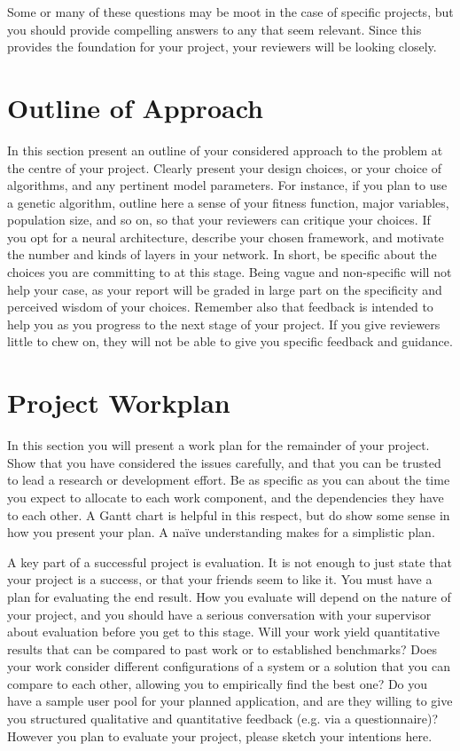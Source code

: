 \documentclass[]{UCD_CS_FYP_Report}
\begin{document}
Some or many of these questions may be moot in the case of specific projects, but you should provide compelling answers to any that seem relevant. Since this provides the foundation for your project, your reviewers will be looking closely.

\chapter{Outline of Approach}
In this section present an outline of your considered approach to the problem at the centre of your project. Clearly present your design choices, or your choice of algorithms, and any pertinent model parameters. For instance, if you plan to use a genetic algorithm, outline here a sense of your fitness function, major variables, population size, and so on, so that your reviewers can critique your choices. If you opt for a neural architecture, describe your chosen framework, and motivate the number and kinds of layers in your network. In short, be specific about the choices you are committing to at this stage. Being vague and non-specific will not help your case, as your report will be graded in large part on the specificity and perceived wisdom of your choices. Remember also that feedback is intended to help you as you progress to the next stage of your project. If you give reviewers little to chew on, they will not be able to give you specific feedback and guidance.


\chapter{Project Workplan}
In this section you will present a work plan for the remainder of your project. Show that you have considered the issues carefully, and that you can be trusted to lead a research or development effort. Be as specific as you can about the time you expect to allocate to each work component, and the dependencies they have to each other. A Gantt chart is helpful in this respect, but do show some sense in how you present your plan. A naïve understanding makes for a simplistic plan.

A key part of a successful project is evaluation. It is not enough to just state that your project is a success, or that your friends seem to like it. You must have a plan for evaluating the end result. How you evaluate will depend on the nature of your project, and you should have a serious conversation with your supervisor about evaluation before you get to this stage. Will your work yield quantitative results that can be compared to past work or to established benchmarks? Does your work consider different configurations of a system or a solution that you can compare to each other, allowing you to empirically find the best one? Do you have a sample user pool for your planned application, and are they willing to give you structured qualitative and quantitative feedback (e.g. via a questionnaire)? However you plan to evaluate your project, please sketch your intentions here.
\end{document}
